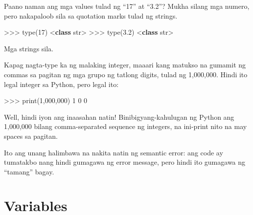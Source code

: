 \documentclass[10pt,]{book}
\newenvironment{Shaded}{}{}
\newcommand{\BuiltInTok}[1]{\textcolor[rgb]{0.00,0.50,0.00}{#1}}
\newcommand{\DecValTok}[1]{\textcolor[rgb]{0.25,0.63,0.44}{#1}}
\newcommand{\KeywordTok}[1]{\textcolor[rgb]{0.00,0.44,0.13}{\textbf{#1}}}
\newcommand{\NormalTok}[1]{#1}
\newcommand{\OperatorTok}[1]{\textcolor[rgb]{0.40,0.40,0.40}{#1}}
\newcommand{\StringTok}[1]{\textcolor[rgb]{0.25,0.44,0.63}{#1}}
\begin{document}
Paano naman ang mga values tulad ng ``17'' at ``3.2''? Mukha silang mga
numero, pero nakapaloob sila sa quotation marks tulad ng strings.


\begin{Shaded}
\begin{Highlighting}[]
\OperatorTok{\textgreater{}\textgreater{}\textgreater{}} \BuiltInTok{type}\NormalTok{(}\StringTok{\textquotesingle{}17\textquotesingle{}}\NormalTok{)}
\OperatorTok{\textless{}}\KeywordTok{class} \StringTok{\textquotesingle{}str\textquotesingle{}}\OperatorTok{\textgreater{}}
\OperatorTok{\textgreater{}\textgreater{}\textgreater{}} \BuiltInTok{type}\NormalTok{(}\StringTok{\textquotesingle{}3.2\textquotesingle{}}\NormalTok{)}
\OperatorTok{\textless{}}\KeywordTok{class} \StringTok{\textquotesingle{}str\textquotesingle{}}\OperatorTok{\textgreater{}}
\end{Highlighting}
\end{Shaded}

Mga strings sila.

Kapag nagta-type ka ng malaking integer, maaari kang matukso na gumamit
ng commas sa pagitan ng mga grupo ng tatlong digits, tulad ng 1,000,000.
Hindi ito legal integer sa Python, pero legal ito:

\begin{Shaded}
\begin{Highlighting}[]
\OperatorTok{\textgreater{}\textgreater{}\textgreater{}} \BuiltInTok{print}\NormalTok{(}\DecValTok{1}\NormalTok{,}\DecValTok{000}\NormalTok{,}\DecValTok{000}\NormalTok{)}
\DecValTok{1} \DecValTok{0} \DecValTok{0}
\end{Highlighting}
\end{Shaded}

Well, hindi iyon ang inaasahan natin! Binibigyang-kahulugan ng Python
ang 1,000,000 bilang comma-separated sequence ng integers, na ini-print
nito na may spaces sa pagitan.

  

Ito ang unang halimbawa na nakita natin ng semantic error: ang code ay
tumatakbo nang hindi gumagawa ng error message, pero hindi ito gumagawa
ng ``tamang'' bagay.

\section{Variables}\label{variables}
\end{document}
